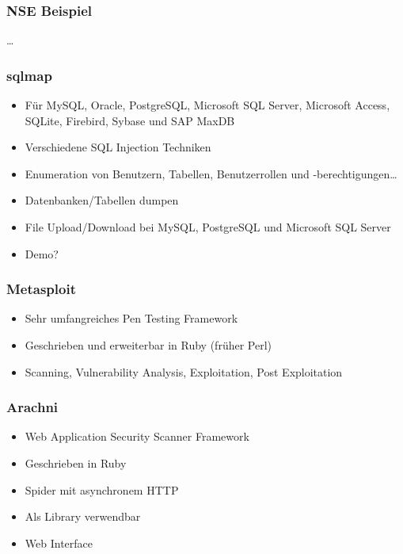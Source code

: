 \documentclass[11pt]{beamer}
\begin{document}
\begin{frame}[fragile]\frametitle{NSE Beispiel}
\label{sec-2-5}

\ldots{}
\end{frame}
\begin{frame}[fragile]\frametitle{sqlmap}
\label{sec-2-6}
\begin{itemize}

\item Für MySQL, Oracle, PostgreSQL, Microsoft SQL Server, Microsoft Access, SQLite, Firebird, Sybase und SAP MaxDB\\
\label{sec-2-6-1}%
\item Verschiedene SQL Injection Techniken\\
\label{sec-2-6-2}%
\item Enumeration von Benutzern, Tabellen, Benutzerrollen und -berechtigungen\ldots{}\\
\label{sec-2-6-3}%
\item Datenbanken/Tabellen dumpen\\
\label{sec-2-6-4}%
\item File Upload/Download bei MySQL, PostgreSQL und Microsoft SQL Server\\
\label{sec-2-6-5}%
\item Demo?\\
\label{sec-2-6-6}%
\end{itemize} %
\end{frame}
\begin{frame}[fragile]\frametitle{Metasploit}
\label{sec-2-7}
\begin{itemize}

\item Sehr umfangreiches Pen Testing Framework\\
\label{sec-2-7-1}%
\item Geschrieben und erweiterbar in Ruby (früher Perl)\\
\label{sec-2-7-2}%
\item Scanning, Vulnerability Analysis, Exploitation, Post Exploitation\\
\label{sec-2-7-3}%
\end{itemize} %
\end{frame}
\begin{frame}[fragile]\frametitle{Arachni}
\label{sec-2-8}
\begin{itemize}

\item Web Application Security Scanner Framework\\
\label{sec-2-8-1}%
\item Geschrieben in Ruby\\
\label{sec-2-8-2}%
\item Spider mit asynchronem HTTP\\
\label{sec-2-8-3}%
\item Als Library verwendbar\\
\label{sec-2-8-4}%
\item Web Interface\\
\label{sec-2-8-5}%
\end{itemize} %
\end{frame}
\end{document}
